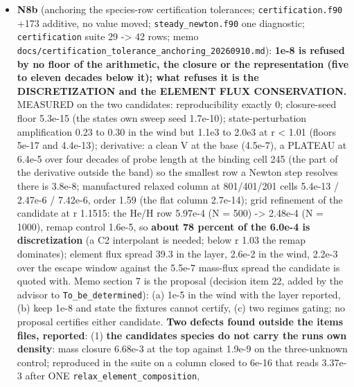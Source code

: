 \documentclass[english,a4paper]{my_memo}
\begin{document}
\begin{itemize}
  the PTC route\textquotesingle s setup report, \texttt{sec\_ion\_step} on a re-evaluated state, the
  stale test header, \texttt{Run\ mode} in the input schema). (a), the column
  preconditioner, waits for N8b\textquotesingle s numbers. The user manual PDF was rebuilt
  by the advisor (85 pages; it was two keys behind its source: \texttt{Restart\ intent}, \texttt{Restart\ option\ change}).
\item
  \textbf{N8b} (anchoring the species-row certification tolerances;
  \texttt{certification.f90} +173 additive, no value moved; \texttt{steady\_newton.f90} one
  diagnostic; \texttt{certification} suite 29 -\textgreater{} 42 rows; memo
  \texttt{docs/certification\_tolerance\_anchoring\_20260910.md}): \textbf{1e-8 is refused
  by no floor of the arithmetic, the closure or the representation (five to
  eleven decades below it); what refuses it is the DISCRETIZATION and the
  ELEMENT FLUX CONSERVATION.} MEASURED on the two candidates: reproducibility
  exactly 0; closure-seed floor 5.3e-15 (the state\textquotesingle s own sweep seed
  1.7e-10); state-perturbation amplification 0.23 to 0.30 in the wind but
  1.1e3 to 2.0e3 at r \textless{} 1.01 (floors 5e-17 and 4.4e-13); derivative: a
  clean V at the base (4.5e-7), a PLATEAU at 6.4e-5 over four decades of
  probe length at the binding cell 245 (the part of the derivative outside
  the band) so the smallest row a Newton step resolves there is 3.8e-8;
  manufactured relaxed column at 801/401/201 cells 5.4e-13 / 2.47e-6 /
  7.42e-6, order 1.59 (the flat column 2.7e-14); grid refinement of the
  candidate at r 1.1515: the He/H row 5.97e-4 (N = 500) -\textgreater{} 2.48e-4 (N =
  1000), remap control 1.6e-5, so \textbf{about 78 percent of the 6.0e-4 is
  discretization} (a C2 interpolant is needed; below r 1.03 the remap
  dominates); element flux spread 39.3 in the layer, 2.6e-2 in the wind,
  2.2e-3 over the escape window against the 5.5e-7 mass-flux spread the candidate
  is quoted with. Memo section 7 is the proposal (decision item 22, added
  by the advisor to \texttt{To\_be\_determined}): (a) 1e-5 in the wind with the layer
  reported, (b) keep 1e-8 and state the fixtures cannot certify, (c) two
  regimes gating; no proposal certifies either candidate. \textbf{Two defects found
  outside the item\textquotesingle s files, reported}: (1) \textbf{the candidate\textquotesingle s species do not
  carry the run\textquotesingle s own density}: mass closure 6.68e-3 at the top against
  1.9e-9 on the three-unknown control; reproduced in the suite on a column
  closed to 6e-16 that reads 3.37e-3 after ONE \texttt{relax\_element\_composition},

\end{itemize}
\end{document}

